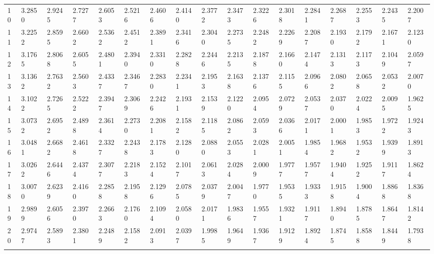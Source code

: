 {\begin{tabular}{|m{8pt}|m{18pt}*{15}{m{18pt}}}
 10 & 3.2850 & 2.9245 & 2.7277 & 2.6053 & 2.5216 & 2.4606 & 2.4140 & 2.3772 & 2.3473 & 2.3226 & 2.3018 & 2.2841 & 2.2687 & 2.2553 & 2.2435 & 2.2007 \\[2pt] \arrayrulecolor{light-gray}\hline\arrayrulecolor{black}  
 11 & 3.2252 & 2.8595 & 2.6602 & 2.5362 & 2.4512 & 2.3891 & 2.3416 & 2.3040 & 2.2735 & 2.2482 & 2.2269 & 2.2087 & 2.1930 & 2.1792 & 2.1671 & 2.1230 \\[2pt] \arrayrulecolor{light-gray}\hline\arrayrulecolor{black}  
 12 & 3.1765 & 2.8068 & 2.6055 & 2.4801 & 2.3940 & 2.3310 & 2.2828 & 2.2446 & 2.2135 & 2.1878 & 2.1660 & 2.1474 & 2.1313 & 2.1173 & 2.1049 & 2.0597 \\[2pt] \arrayrulecolor{light-gray}\hline\arrayrulecolor{black}  
 13 & 3.1362 & 2.7632 & 2.5603 & 2.4337 & 2.3467 & 2.2830 & 2.2341 & 2.1953 & 2.1638 & 2.1376 & 2.1155 & 2.0966 & 2.0802 & 2.0658 & 2.0532 & 2.0070 \\[2pt] \arrayrulecolor{light-gray}\hline\arrayrulecolor{black}  
 14 & 3.1022 & 2.7265 & 2.5222 & 2.3947 & 2.3069 & 2.2426 & 2.1931 & 2.1539 & 2.1220 & 2.0954 & 2.0729 & 2.0537 & 2.0370 & 2.0224 & 2.0095 & 1.9625 \\[2pt] \arrayrulecolor{light-gray}\hline\arrayrulecolor{black}  
 15 & 3.0732 & 2.6952 & 2.4898 & 2.3614 & 2.2730 & 2.2081 & 2.1582 & 2.1185 & 2.0862 & 2.0593 & 2.0366 & 2.0171 & 2.0001 & 1.9853 & 1.9722 & 1.9243 \\[2pt] \arrayrulecolor{light-gray}\hline\arrayrulecolor{black}  
 16 & 3.0481 & 2.6682 & 2.4618 & 2.3327 & 2.2438 & 2.1783 & 2.1280 & 2.0880 & 2.0553 & 2.0281 & 2.0051 & 1.9854 & 1.9682 & 1.9532 & 1.9399 & 1.8913 \\[2pt] \arrayrulecolor{light-gray}\hline\arrayrulecolor{black}  
 17 & 3.0262 & 2.6446 & 2.4374 & 2.3077 & 2.2183 & 2.1524 & 2.1017 & 2.0613 & 2.0284 & 2.0009 & 1.9777 & 1.9577 & 1.9404 & 1.9252 & 1.9117 & 1.8624 \\[2pt] \arrayrulecolor{light-gray}\hline\arrayrulecolor{black}  
 18 & 3.0070 & 2.6239 & 2.4160 & 2.2858 & 2.1958 & 2.1296 & 2.0785 & 2.0379 & 2.0047 & 1.9770 & 1.9535 & 1.9333 & 1.9158 & 1.9004 & 1.8868 & 1.8368 \\[2pt] \arrayrulecolor{light-gray}\hline\arrayrulecolor{black}  
 19 & 2.9899 & 2.6056 & 2.3970 & 2.2663 & 2.1760 & 2.1094 & 2.0580 & 2.0171 & 1.9836 & 1.9557 & 1.9321 & 1.9117 & 1.8940 & 1.8785 & 1.8647 & 1.8142 \\[2pt] \arrayrulecolor{light-gray}\hline\arrayrulecolor{black}  
 20 & 2.9747 & 2.5893 & 2.3801 & 2.2489 & 2.1582 & 2.0913 & 2.0397 & 1.9985 & 1.9649 & 1.9367 & 1.9129 & 1.8924 & 1.8745 & 1.8588 & 1.8449 & 1.7938 \\[2pt] \arrayrulecolor{light-gray}\hline\arrayrulecolor{black}  

\end{tabular}}
